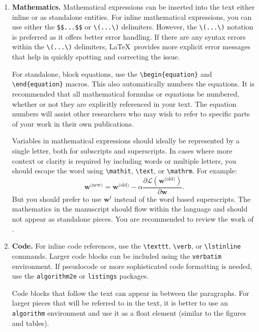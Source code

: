 \documentclass[fullpaper]{nldl}
\begin{document}
\begin{enumerate}[leftmargin=*]
\item \textbf{Mathematics.}
Mathematical expressions can be inserted into the text either inline or as standalone entities. For inline mathematical expressions, you can use either the \verb|$$...$$| or \verb|\(...\)| delimiters.
However, the \verb|\(...\)| notation is preferred as it offers better error handling.
If there are any syntax errors within the \verb|\(...\)| delimiters, \LaTeX\ provides more explicit error messages that help in quickly spotting and correcting the issue.

For standalone, block equations, use the \verb|\begin{equation}| and \verb|\end{equation}| macros.
This also automatically numbers the equations.
It is recommended that all mathematical formulas or equations be numbered, whether or not they are explicitly referenced in your text.
The equation numbers will assist other researchers who may wish to refer to specific parts of your work in their own publications.


Variables in mathematical expressions should ideally be represented by a single letter, both for subscripts and superscripts.
In cases where more context or clarity is required by including words or multiple letters, you should escape the word using \verb|\mathit|, \verb|\text|, or \verb|\mathrm|.
For example:
\begin{equation}
  \mathbf{w}^{\text{(new)}} = \mathbf{w}^{\text{(old)}} - \alpha \frac{\partial \mathcal{L}(\mathbf{w}^{\text{(old)}})}{\partial \mathbf{w}}.
\end{equation}
But you should prefer to use $\mathbf{w}^{t}$ instead of the word based superscripts.
The mathematics in the manuscript should flow within the language and should not appear as standalone pieces.
You are recommended to review the work of \citet{Knuth1989}.

\item \textbf{Code.}
For inline code references, use the \verb|\texttt|, \verb|\verb|, or \verb|\lstinline| commands.
Larger code blocks can be included using the \verb|verbatim| environment.
If pseudocode or more sophisticated code formatting is needed, use the \verb|algorithm2e| or \verb|listings| packages.

Code blocks that follow the text can appear in between the paragraphs.
For larger pieces that will be referred to in the text, it is better to use an \verb|algorithm| environment and use it as a float element (similar to the figures and tables).


\end{enumerate}
\end{document}
